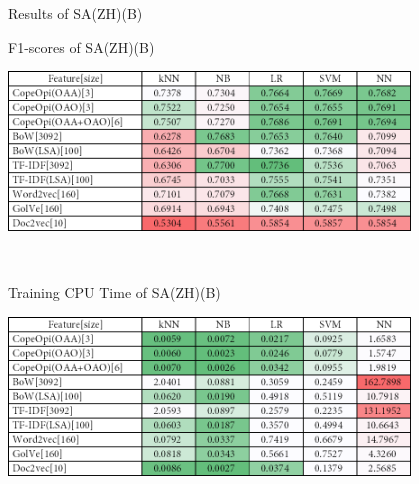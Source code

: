\caption{Results of SA(ZH)(B)}
\label{tab:sa_zh_b}
\centering
\begin{subtable}{\textwidth}
	\centering
	\caption{F1-scores of SA(ZH)(B)}
	\includegraphics[width=0.8\textwidth]{./figure/02A2.png}
\end{subtable}\\[1em]
\begin{subtable}{\textwidth}
	\centering
	\caption{Training CPU Time of SA(ZH)(B)}
	\includegraphics[width=0.8\textwidth]{./figure/02A2t.png}
\end{subtable}
